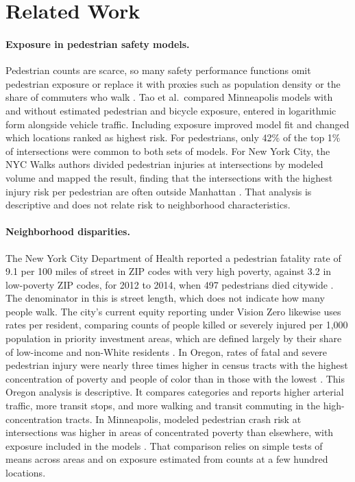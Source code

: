 \documentclass[10pt,twocolumn]{article}
\begin{document}
\section{Related Work}
\paragraph{Exposure in pedestrian safety models.} Pedestrian counts are scarce, so many safety performance functions omit pedestrian exposure or replace it with proxies such as population density or the share of commuters who walk \citep{tao2021exposure}. Tao et al.\ compared Minneapolis models with and without estimated pedestrian and bicycle exposure, entered in logarithmic form alongside vehicle traffic. Including exposure improved model fit and changed which locations ranked as highest risk. For pedestrians, only 42\% of the top 1\% of intersections were common to both sets of models. For New York City, the NYC Walks authors divided pedestrian injuries at intersections by modeled volume and mapped the result, finding that the intersections with the highest injury risk per pedestrian are often outside Manhattan \citep{sevtsuk2026nycwalks}. That analysis is descriptive and does not relate risk to neighborhood characteristics.

\paragraph{Neighborhood disparities.} The New York City Department of Health reported a pedestrian fatality rate of 9.1 per 100 miles of street in ZIP codes with very high poverty, against 3.2 in low-poverty ZIP codes, for 2012 to 2014, when 497 pedestrians died citywide \citep{nychealth2017}. The denominator in this is street length, which does not indicate how many people walk. The city's current equity reporting under Vision Zero likewise uses rates per resident, comparing counts of people killed or severely injured per 1,000 population in priority investment areas, which are defined largely by their share of low-income and non-White residents \citep{vzreimagined2026}. In Oregon, rates of fatal and severe pedestrian injury were nearly three times higher in census tracts with the highest concentration of poverty and people of color than in those with the lowest \citep{roll2021oregon}. This Oregon analysis is descriptive. It compares categories and reports higher arterial traffic, more transit stops, and more walking and transit commuting in the high-concentration tracts. In Minneapolis, modeled pedestrian crash risk at intersections was higher in areas of concentrated poverty than elsewhere, with exposure included in the models \citep{lindsey2019equity}. That comparison relies on simple tests of means across areas and on exposure estimated from counts at a few hundred locations.
\end{document}
